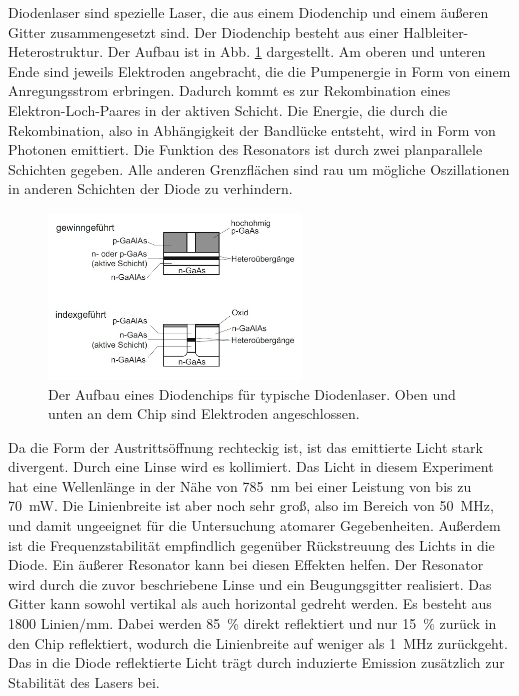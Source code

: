 Diodenlaser sind spezielle Laser, die aus einem Diodenchip und einem äußeren Gitter zusammengesetzt sind. 
Der Diodenchip besteht aus einer Halbleiter-Heterostruktur. Der Aufbau ist in Abb. \ref{abb:chip} dargestellt. Am oberen und unteren Ende sind jeweils Elektroden angebracht, die die Pumpenergie in Form von einem Anregungsstrom erbringen. Dadurch kommt es zur Rekombination eines Elektron-Loch-Paares in der aktiven Schicht. Die Energie, die durch die Rekombination, also in Abhängigkeit der Bandlücke entsteht, wird in Form von Photonen emittiert. Die Funktion des Resonators ist durch zwei planparallele Schichten gegeben. Alle anderen Grenzflächen sind rau um mögliche Oszillationen in anderen Schichten der Diode zu verhindern.  

\begin{figure}
    \centering
    \includegraphics[width=0.6\textwidth]{pics/chip.jpg}
    \caption{Der Aufbau eines Diodenchips für typische Diodenlaser. Oben und unten an dem Chip sind Elektroden angeschlossen. \cite{eichler}}
    \label{abb:chip}
\end{figure}


Da die Form der Austrittsöffnung rechteckig ist, ist das emittierte Licht stark divergent. Durch eine Linse wird es kollimiert. Das Licht in diesem Experiment hat eine Wellenlänge in der Nähe von \SI{785}{\nm} bei einer Leistung von bis zu \SI{70}{\mW}. Die Linienbreite ist aber noch sehr groß, also im Bereich von \SI{50}{\MHz}, und damit ungeeignet für die Untersuchung atomarer Gegebenheiten. Außerdem ist die Frequenzstabilität empfindlich gegenüber Rückstreuung des Lichts in die Diode. Ein äußerer Resonator kann bei diesen Effekten helfen.
Der Resonator wird durch die zuvor beschriebene Linse und ein Beugungsgitter realisiert. Das Gitter kann sowohl vertikal als auch horizontal gedreht werden. Es besteht aus \num{1800} Linien$/$\si{\milli\metre}. Dabei werden \SI{85}{\percent} direkt reflektiert und nur \SI{15}{\percent} zurück in den Chip reflektiert, wodurch die Linienbreite auf weniger als \SI{1}{\MHz} zurückgeht. Das in die Diode reflektierte Licht trägt durch induzierte Emission zusätzlich zur Stabilität des Lasers bei. \cite{anleitung}

